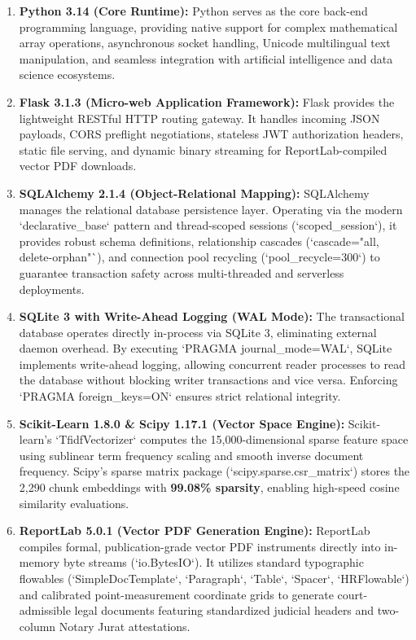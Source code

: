 \begin{enumerate}
    \item \textbf{Python 3.14 (Core Runtime):}
    Python serves as the core back-end programming language, providing native support for complex mathematical array operations, asynchronous socket handling, Unicode multilingual text manipulation, and seamless integration with artificial intelligence and data science ecosystems.
    
    \item \textbf{Flask 3.1.3 (Micro-web Application Framework):}
    Flask provides the lightweight RESTful HTTP routing gateway. It handles incoming JSON payloads, CORS preflight negotiations, stateless JWT authorization headers, static file serving, and dynamic binary streaming for ReportLab-compiled vector PDF downloads.
    
    \item \textbf{SQLAlchemy 2.1.4 (Object-Relational Mapping):}
    SQLAlchemy manages the relational database persistence layer. Operating via the modern `declarative_base` pattern and thread-scoped sessions (`scoped_session`), it provides robust schema definitions, relationship cascades (`cascade="all, delete-orphan"`), and connection pool recycling (`pool_recycle=300`) to guarantee transaction safety across multi-threaded and serverless deployments.
    
    \item \textbf{SQLite 3 with Write-Ahead Logging (WAL Mode):}
    The transactional database operates directly in-process via SQLite 3, eliminating external daemon overhead. By executing `PRAGMA journal_mode=WAL`, SQLite implements write-ahead logging, allowing concurrent reader processes to read the database without blocking writer transactions and vice versa. Enforcing `PRAGMA foreign_keys=ON` ensures strict relational integrity.
    
    \item \textbf{Scikit-Learn 1.8.0 \& Scipy 1.17.1 (Vector Space Engine):}
    Scikit-learn's `TfidfVectorizer` computes the 15,000-dimensional sparse feature space using sublinear term frequency scaling and smooth inverse document frequency. Scipy's sparse matrix package (`scipy.sparse.csr_matrix`) stores the 2,290 chunk embeddings with \textbf{99.08\% sparsity}, enabling high-speed cosine similarity evaluations.
    
    \item \textbf{ReportLab 5.0.1 (Vector PDF Generation Engine):}
    ReportLab compiles formal, publication-grade vector PDF instruments directly into in-memory byte streams (`io.BytesIO`). It utilizes standard typographic flowables (`SimpleDocTemplate`, `Paragraph`, `Table`, `Spacer`, `HRFlowable`) and calibrated point-measurement coordinate grids to generate court-admissible legal documents featuring standardized judicial headers and two-column Notary Jurat attestations.
    

\end{enumerate}
